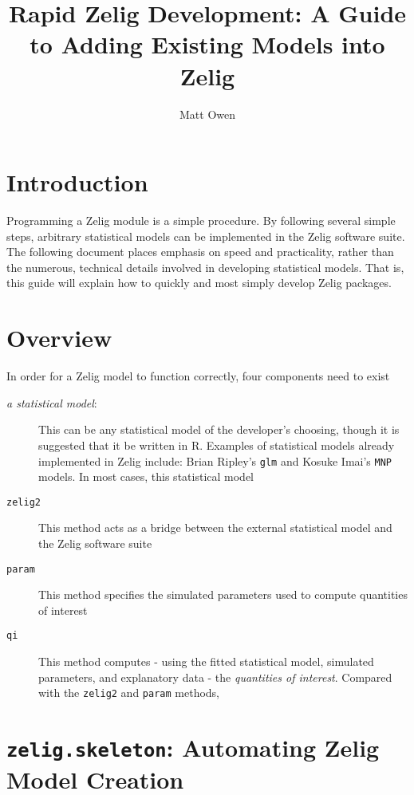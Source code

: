 \documentclass{article}
\title{Rapid Zelig Development: A Guide to Adding Existing Models into Zelig}
\author{Matt Owen}
\newcommand{\code}[1]{{\tt #1}}
\begin{document}
\maketitle


\section{Introduction}

Programming a Zelig module is a simple procedure. By following several simple steps, arbitrary statistical models can be implemented in the Zelig software suite. The following document places emphasis on speed and practicality, rather than the numerous, technical details involved in developing statistical models. That is, this guide will explain how to quickly and most simply develop Zelig packages.

\section{Overview}

In order for a Zelig model to function correctly, four components need to exist

\begin{description}

	\item[\emph{a statistical model}:] This can be any statistical model of the developer's choosing, though it is suggested that it be written in R. Examples of statistical models already implemented in Zelig include: Brian Ripley's \code{glm} and Kosuke Imai's \code{MNP} models. In most cases, this statistical model
	\item[\code{zelig2}] This method acts as a bridge between the external statistical model and the Zelig software suite
	\item[\code{param}] This method specifies the simulated parameters used to compute quantities of interest
	\item[\code{qi}] This method computes - using the fitted statistical model, simulated parameters, and explanatory data - the \emph{quantities of interest}. Compared with the \code{zelig2} and \code{param} methods, 
\end{description}

\section{\code{zelig.skeleton}: Automating Zelig Model Creation}
\end{document}
